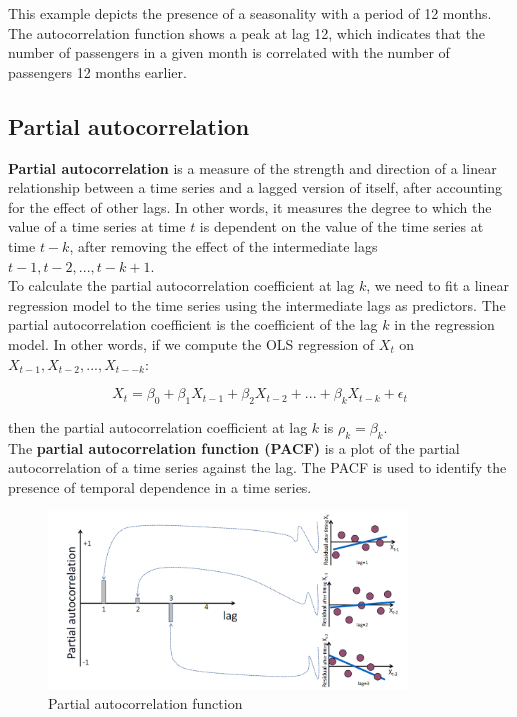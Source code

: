 This example depicts the presence of a seasonality with a period of 12 months. The
autocorrelation function shows a peak at lag 12, which indicates that the number of
passengers in a given month is correlated with the number of passengers 12 months
earlier.

\subsection{Partial autocorrelation}

\textbf{Partial autocorrelation} is a measure of the strength and direction of a linear
relationship between a time series and a lagged version of itself, after accounting for
the effect of other lags. In other words, it measures the degree to which the value of
a time series at time $t$ is dependent on the value of the time series at time $t - k$,
after removing the effect of the intermediate lags $t - 1, t - 2, ..., t - k + 1$.\\

To calculate the partial autocorrelation coefficient at lag $k$, we need to fit a linear
regression model to the time series using the intermediate lags as predictors. The
partial autocorrelation coefficient is the coefficient of the lag $k$ in the regression
model. In other words, if we compute the OLS regression of $X_t$ on $X_{t-1}, X_{t-2}, ...,
X_{t--k}$:

$$X_t = \beta_0 + \beta_1 X_{t-1} + \beta_2 X_{t-2} + ... + \beta_k X_{t-k} + \epsilon_t$$

then the partial autocorrelation coefficient at lag $k$ is $\rho_k = \beta_k$.\\

The \textbf{partial autocorrelation function (PACF)} is a plot of the partial autocorrelation
of a time series against the lag. The PACF is used to identify the presence of temporal
dependence in a time series.

\begin{figure}[H]
    \centering
    \includegraphics[width=0.85\textwidth]{figures/pacf.png}
    \caption{Partial autocorrelation function}
    \label{fig:pacf}
\end{figure}

